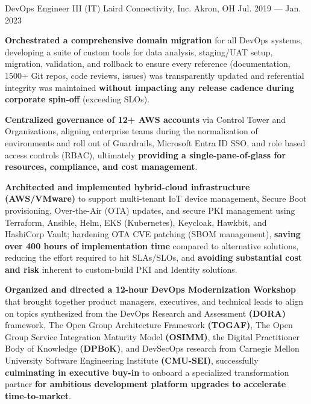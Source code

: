 \begin{cventries}
    \cventry
        { DevOps Engineer III (IT) }
        { Laird Connectivity, Inc. }
        { Akron, OH }
        { Jul. 2019 --- Jan. 2023 }
        {
            \begin{cvitems}
                \item{\textbf{Orchestrated a comprehensive domain migration} for all DevOps systems, developing a suite of custom tools for data analysis, staging/UAT setup, migration, validation, and rollback to ensure every reference (documentation, 1500+ Git repos, code reviews, issues) was transparently updated and referential integrity was maintained \textbf{without impacting any release cadence during corporate spin-off} (exceeding SLOs).}
                \item{\textbf{Centralized governance of 12+ AWS accounts} via Control Tower and Organizations, aligning enterprise teams during the normalization of environments and roll out of Guardrails, Microsoft Entra ID SSO, and role based access controls (RBAC), ultimately \textbf{providing a single-pane-of-glass for resources, compliance, and cost management}.}
                \item{\textbf{Architected and implemented hybrid-cloud infrastructure (AWS/VMware)} to support multi-tenant IoT device management, Secure Boot provisioning, Over-the-Air (OTA) updates, and secure PKI management using Terraform, Ansible, Helm, EKS (Kubernetes), Keycloak, Hawkbit, and HashiCorp Vault; hardening OTA CVE patching (SBOM management), \textbf{saving over 400 hours of implementation time} compared to alternative solutions, reducing the effort required to hit SLAs/SLOs, and \textbf{avoiding substantial cost and risk} inherent to custom-build PKI and Identity solutions.}
                \item{\textbf{Organized and directed a 12-hour DevOps Modernization Workshop} that brought together product managers, executives, and technical leads to align on topics synthesized from the DevOps Research and Assessment \textbf{(DORA)} framework, The Open Group Architecture Framework \textbf{(TOGAF)}, The Open Group Service Integration Maturity Model \textbf{(OSIMM)}, the Digital Practitioner Body of Knowledge \textbf{(DPBoK)}, and DevSecOps research from Carnegie Mellon University Software Engineering Institute \textbf{(CMU-SEI)}, successfully \textbf{culminating in executive buy-in} to onboard a specialized transformation partner \textbf{for ambitious development platform upgrades to accelerate time-to-market}.}
            \end{cvitems}
        }
\end{cventries}

